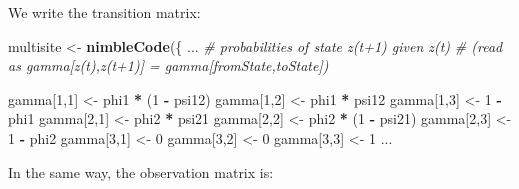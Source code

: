 \documentclass[
  12pt,
]{krantz}
\newenvironment{Shaded}{\begin{snugshade}}{\end{snugshade}}
\newcommand{\CommentTok}[1]{\textcolor[rgb]{0.56,0.35,0.01}{\textit{#1}}}
\newcommand{\DecValTok}[1]{\textcolor[rgb]{0.00,0.00,0.81}{#1}}
\newcommand{\FunctionTok}[1]{\textcolor[rgb]{0.13,0.29,0.53}{\textbf{#1}}}
\newcommand{\NormalTok}[1]{#1}
\newcommand{\OtherTok}[1]{\textcolor[rgb]{0.56,0.35,0.01}{#1}}
\newcommand{\SpecialCharTok}[1]{\textcolor[rgb]{0.81,0.36,0.00}{\textbf{#1}}}
\begin{document}
We write the transition matrix:

\begin{Shaded}
\begin{Highlighting}[]
\NormalTok{multisite }\OtherTok{\textless{}{-}} \FunctionTok{nimbleCode}\NormalTok{(\{}
\NormalTok{...}
  \CommentTok{\# probabilities of state z(t+1) given z(t)}
  \CommentTok{\# (read as gamma[z(t),z(t+1)] = gamma[fromState,toState])}

\NormalTok{  gamma[}\DecValTok{1}\NormalTok{,}\DecValTok{1}\NormalTok{] }\OtherTok{\textless{}{-}}\NormalTok{ phi1 }\SpecialCharTok{*}\NormalTok{ (}\DecValTok{1} \SpecialCharTok{{-}}\NormalTok{ psi12)}
\NormalTok{  gamma[}\DecValTok{1}\NormalTok{,}\DecValTok{2}\NormalTok{] }\OtherTok{\textless{}{-}}\NormalTok{ phi1 }\SpecialCharTok{*}\NormalTok{ psi12}
\NormalTok{  gamma[}\DecValTok{1}\NormalTok{,}\DecValTok{3}\NormalTok{] }\OtherTok{\textless{}{-}} \DecValTok{1} \SpecialCharTok{{-}}\NormalTok{ phi1}
\NormalTok{  gamma[}\DecValTok{2}\NormalTok{,}\DecValTok{1}\NormalTok{] }\OtherTok{\textless{}{-}}\NormalTok{ phi2 }\SpecialCharTok{*}\NormalTok{ psi21}
\NormalTok{  gamma[}\DecValTok{2}\NormalTok{,}\DecValTok{2}\NormalTok{] }\OtherTok{\textless{}{-}}\NormalTok{ phi2 }\SpecialCharTok{*}\NormalTok{ (}\DecValTok{1} \SpecialCharTok{{-}}\NormalTok{ psi21)}
\NormalTok{  gamma[}\DecValTok{2}\NormalTok{,}\DecValTok{3}\NormalTok{] }\OtherTok{\textless{}{-}} \DecValTok{1} \SpecialCharTok{{-}}\NormalTok{ phi2}
\NormalTok{  gamma[}\DecValTok{3}\NormalTok{,}\DecValTok{1}\NormalTok{] }\OtherTok{\textless{}{-}} \DecValTok{0}
\NormalTok{  gamma[}\DecValTok{3}\NormalTok{,}\DecValTok{2}\NormalTok{] }\OtherTok{\textless{}{-}} \DecValTok{0}
\NormalTok{  gamma[}\DecValTok{3}\NormalTok{,}\DecValTok{3}\NormalTok{] }\OtherTok{\textless{}{-}} \DecValTok{1}
\NormalTok{...}
\end{Highlighting}
\end{Shaded}

In the same way, the observation matrix is:
\end{document}
